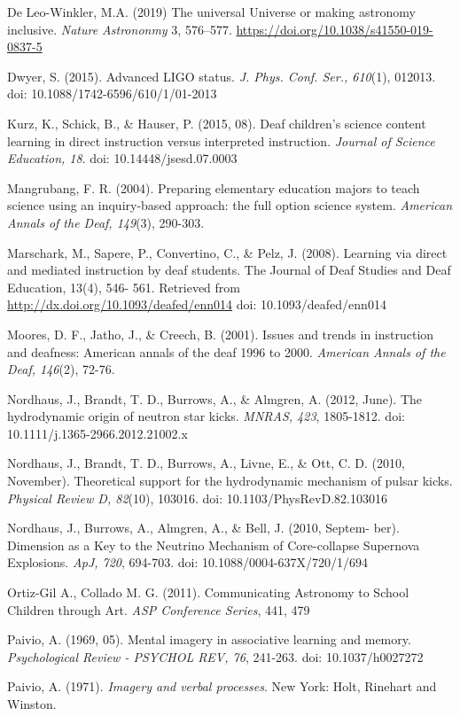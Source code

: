 \documentclass[11.5pt]{sig-alternate} %
\begin{document}
De Leo-Winkler, M.A. (2019) The universal Universe or making astronomy inclusive. \textit{Nature Astrononmy} 3, 576–577. \url{https://doi.org/10.1038/s41550-019-0837-5} 

Dwyer, S. (2015). Advanced LIGO status. \textit{J. Phys. Conf. Ser., 610}(1), 012013. doi: 10.1088/1742-6596/610/1/01-2013 

Kurz, K., Schick, B., \& Hauser, P. (2015, 08). Deaf children’s science content learning in direct instruction versus interpreted instruction. \textit{Journal of Science Education, 18}. doi: 10.14448/jsesd.07.0003 

Mangrubang, F. R. (2004). Preparing elementary education majors to teach science using an inquiry-based approach: the full option science system. \textit{American Annals of the Deaf, 149}(3), 290-303. 

Marschark, M., Sapere, P., Convertino, C., \& Pelz, J. (2008). Learning via direct and mediated instruction by deaf students. The Journal of Deaf Studies and Deaf Education, 13(4), 546- 561. Retrieved from \url{http://dx.doi.org/10.1093/deafed/enn014} doi: 10.1093/deafed/enn014 

Moores, D. F., Jatho, J., \& Creech, B. (2001). Issues and trends in instruction and deafness: American annals of the deaf 1996 to 2000. \textit{American Annals of the Deaf, 146}(2), 72-76. 

Nordhaus, J., Brandt, T. D., Burrows, A., \& Almgren, A. (2012, June). The hydrodynamic origin of neutron star kicks. \textit{MNRAS, 423}, 1805-1812. doi: 10.1111/j.1365-2966.2012.21002.x 

Nordhaus, J., Brandt, T. D., Burrows, A., Livne, E., \& Ott, C. D. (2010, November). Theoretical support for the hydrodynamic mechanism of pulsar kicks. \textit{Physical Review D, 82}(10), 103016. doi: 10.1103/PhysRevD.82.103016 

Nordhaus, J., Burrows, A., Almgren, A., \& Bell, J. (2010, Septem- ber). Dimension as a Key to the Neutrino Mechanism of Core-collapse Supernova Explosions. \textit{ApJ, 720}, 694-703. doi: 10.1088/0004-637X/720/1/694 

Ortiz-Gil A., Collado M. G. (2011). Communicating Astronomy to School Children through Art. \textit{ASP Conference Series}, 441, 479

Paivio, A. (1969, 05). Mental imagery in associative learning and memory. \textit{Psychological Review - PSYCHOL REV, 76}, 241-263. doi: 10.1037/h0027272 

Paivio, A. (1971). \textit{Imagery and verbal processes}. New York: Holt, Rinehart and Winston. 
\end{document}
